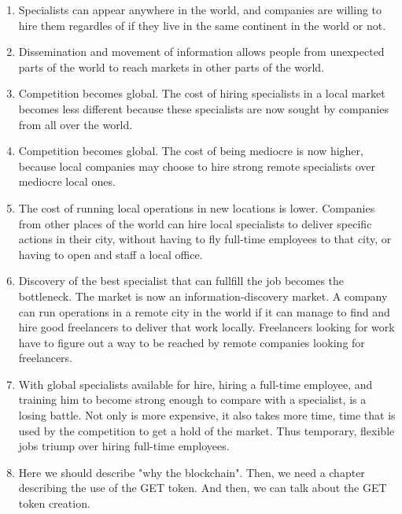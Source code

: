 \documentclass{article}
\begin{document}
\begin{enumerate}
  \item Specialists can appear anywhere in the world, and companies are willing to hire them regardles of if they live in the same continent in the world or not.
  \item Dissemination and movement of information allows people from unexpected parts of the world to reach markets in other parts of the world.
  \item Competition becomes global. The cost of hiring specialists in a local market becomes less different because these specialists are now sought by companies from all over the world.
  \item Competition becomes global. The cost of being mediocre is now higher, because local companies may choose to hire strong remote specialists over mediocre local ones.
  \item The cost of running local operations in new locations is lower. Companies from other places of the world can hire local specialists to deliver specific actions in their city, without having to fly full-time employees to that city, or having to open and staff a local office.
  \item Discovery of the best specialist that can fullfill the job becomes the bottleneck. The market is now an information-discovery market. A company can run operations in a remote city in the world if it can manage to find and hire good freelancers to deliver that work locally. Freelancers looking for work have to figure out a way to be reached by remote companies looking for freelancers.
  \item With global specialists available for hire, hiring a full-time employee, and training him to become strong enough to compare with a specialist, is a losing battle. Not only is more expensive, it also takes more time, time that is used by the competition to get a hold of the market. Thus temporary, flexible jobs triump over hiring full-time employees.
  
  \item Here we should describe "why the blockchain". Then, we need a chapter describing the use of the GET token. And then, we can talk about the GET token creation.
\end{enumerate}
\end{document}
